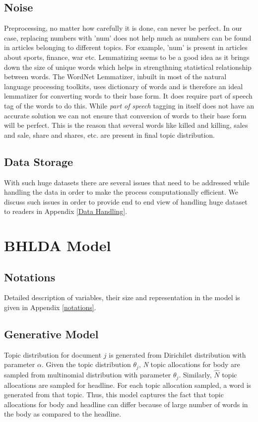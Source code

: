 \documentclass[a4paper]{article}
\begin{document}
\subsection{Noise}
Preprocessing, no matter how carefully it is done, can never be perfect. In our case, replacing numbers with 'num' does not help much as numbers can be found in articles belonging to different topics. For example, 'num' is present in articles about sports, finance, war etc. Lemmatizing seems to be a good idea as it brings down the size of unique words which helps in strengthning statistical relationship between words. The WordNet Lemmatizer, inbuilt in most of the natural language processing toolkits, uses dictionary of words and is therefore an ideal lemmatizer for converting words to their base form. It does require part of speech tag of the words to do this. While \textit{part of speech} tagging in itself does not have an accurate solution we can not ensure that conversion of words to their base form will be perfect. This is the reason that several words like killed and killing, sales and sale, share and shares, etc. are present in final topic distribution.

\subsection{Data Storage}
With such huge datasets there are several issues that need to be addressed while handling the data in order to make the process computationally efficient. We discuss such issues in order to provide end to end view of handling huge dataset to readers in Appendix \ref{Data Handling}.

\section{BHLDA Model}

\subsection{Notations}
Detailed description of variables, their size and representation in the model is given in Appendix \ref{notations}. 

\subsection{Generative Model}
Topic distribution for document $\textit{j}$ is generated from Dirichilet distribution with parameter \textit{$\alpha$}. Given the topic distribution \textit{$\theta_{j}$}, \textit{N} topic allocations for body are sampled from multinomial distribution with parameter \textit{$\theta_{j}$}. Similarly, \textit{$\hat{N}$} topic allocations are sampled for headline. For each topic allocation sampled, a word is generated from that topic. Thus, this model captures the fact that topic allocations for body and headline can differ because of large number of words in the body as compared to the headline. 
\end{document}
